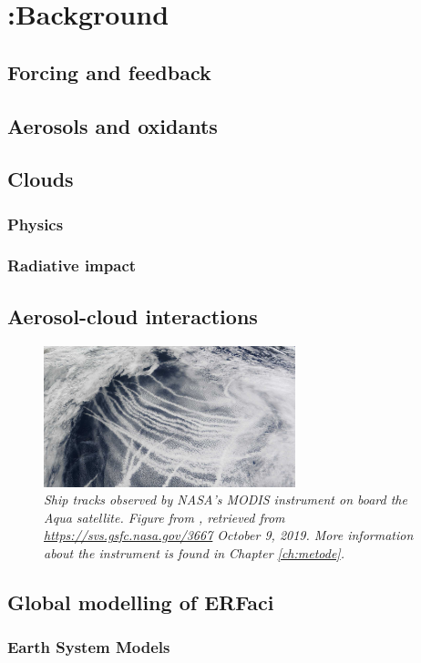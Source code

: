 \chapter[Background]{{\color{red} :}Background}
%
\label{ch:background}

\section{Forcing and feedback}\label{ch:forcefeed}

\section{Aerosols and oxidants}

\section{Clouds}
\subsection{Physics}

\subsection{Radiative impact}

\section{Aerosol-cloud interactions}
\begin{figure}
\centering
    \includegraphics[width=0.65\textwidth]{figurer/ship_tracks.jpg}
\caption{\textit{Ship tracks observed by NASA's MODIS instrument on board the Aqua satellite. Figure from \cite{NASA2010}, retrieved from \url{https://svs.gsfc.nasa.gov/3667} October 9, 2019. More information about the instrument is found in Chapter \ref{ch:metode}.}}
\label{fig:shiptracks}
\end{figure}

\section{Global modelling of ERFaci}
\subsection{Earth System Models}



